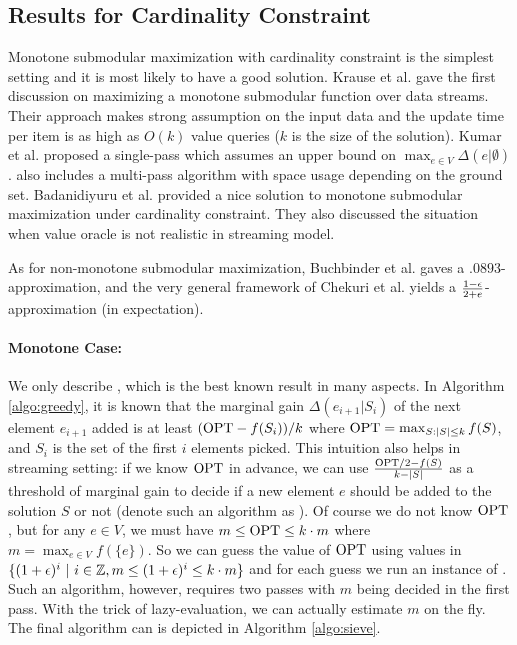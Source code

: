 \subsection{Results for  Cardinality Constraint}
Monotone submodular maximization with cardinality constraint is the simplest setting and it is most likely to have a good solution. Krause et al. \cite{KG10} gave the first discussion on maximizing a monotone submodular function over data streams. Their approach makes strong assumption on the input data and the update time per item is as high as $O(k)$ value queries ($k$ is the size of the solution).  Kumar et al. \cite{KMV+15} proposed a single-pass which assumes an upper bound on $\max_{e\in V}\Delta(e|\emptyset)$. \cite{KMV+15} also includes a multi-pass algorithm with space usage depending on the ground set. Badanidiyuru et al. \cite{BMK+14} provided a nice solution to monotone submodular maximization under cardinality constraint. They also discussed the situation when value oracle is not realistic in streaming model. 

As for non-monotone submodular maximization, Buchbinder et al. \cite{BFS15} gaves a $.0893$-approximation, and the very general framework of Chekuri et al. \cite{CGQ15} yields a $\frac{1-\epsilon}{2 + e}$-approximation (in expectation). 

\paragraph{Monotone Case:} We only describe \cite{BMK+14}, which is the best known result in many aspects.  In Algorithm \ref{algo:greedy}, it is known that the marginal gain $\Delta(e_{i+1}|S_i)$ of the next element $e_{i+1}$ added is at least $(\text{OPT} - f(S_i))/k$ where $\text{OPT}=\max_{S:|S|\leq k} f(S)$, and $S_i$ is the set of the first $i$ elements picked. This intuition also helps in streaming setting: if we know $\text{OPT}$ in advance, we can use $\frac{\text{OPT}/2 - f(S)}{k - |S|}$ as a  threshold of marginal gain to decide if a new element $e$ should be added to the solution $S$ or not (denote such an algorithm as \knowopt). Of course we do not know $\text{OPT}$, but for any $e\in V$, we must have $m \leq \text{OPT} \leq k\cdot m$ where $m = \max_{e\in V}f(\{e\})$. So we can guess the value of $\text{OPT}$ using values in $\{(1 + \epsilon)^i~|~i\in\mathbb{Z}, m\leq (1 + \epsilon)^i \leq k\cdot m\}$ and for each guess we run an instance of \knowopt. Such an algorithm, however, requires two passes with $m$ being decided in the first pass. With the trick of lazy-evaluation, we can actually estimate $m$ on the fly. The final algorithm can is depicted in Algorithm \ref{algo:sieve}.


